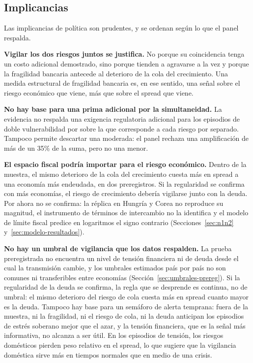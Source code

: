 \subsection{Implicancias}

Las implicancias de política son prudentes, y se ordenan según lo que el panel respalda.

\textbf{Vigilar los dos riesgos juntos se justifica.} No porque su coincidencia tenga un costo adicional demostrado, sino porque tienden a agravarse a la vez y porque la fragilidad bancaria antecede al deterioro de la cola del crecimiento. Una medida estructural de fragilidad bancaria es, en ese sentido, una señal sobre el riesgo económico que viene, más que sobre el spread que viene.

\textbf{No hay base para una prima adicional por la simultaneidad.} La evidencia no respalda una exigencia regulatoria adicional para los episodios de doble vulnerabilidad por sobre la que corresponde a cada riesgo por separado. Tampoco permite descartar una moderada: el panel rechaza una amplificación de más de un 35\% de la suma, pero no una menor.

\textbf{El espacio fiscal podría importar para el riesgo económico.} Dentro de la muestra, el mismo deterioro de la cola del crecimiento cuesta más en spread a una economía más endeudada, en dos preregistros. Si la regularidad se confirma con más economías, el riesgo de crecimiento debería vigilarse junto con la deuda. Por ahora no se confirma: la réplica en Hungría y Corea no reproduce su magnitud, el instrumento de términos de intercambio no la identifica y el modelo de límite fiscal predice en logaritmos el signo contrario (Secciones~\ref{sec:n1n2} y~\ref{sec:modelo-resultados}).

\textbf{No hay un umbral de vigilancia que los datos respalden.} La prueba preregistrada no encuentra un nivel de tensión financiera ni de deuda desde el cual la transmisión cambie, y los umbrales estimados país por país no son comunes ni transferibles entre economías (Sección~\ref{sec:umbrales-prereg}). Si la regularidad de la deuda se confirma, la regla que se desprende es continua, no de umbral: el mismo deterioro del riesgo de cola cuesta más en spread cuanto mayor es la deuda. Tampoco hay base para un semáforo de alerta temprana: fuera de la muestra, ni la fragilidad, ni el riesgo de cola, ni la deuda anticipan los episodios de estrés soberano mejor que el azar, y la tensión financiera, que es la señal más informativa, no alcanza a ser útil. En los episodios de tensión, los riesgos domésticos pierden peso relativo en el spread, lo que sugiere que la vigilancia doméstica sirve más en tiempos normales que en medio de una crisis.

